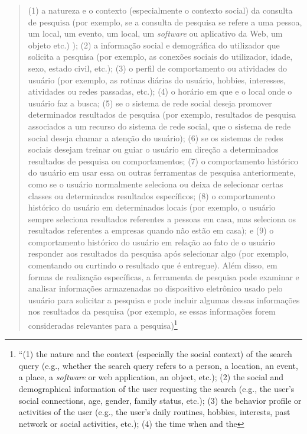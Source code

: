 \begin{quote}
(1) a natureza e o contexto (especialmente o contexto social) da
consulta de pesquisa (por exemplo, se a consulta de pesquisa se refere a
uma pessoa, um local, um evento, um local, um \emph{\emph{software}} ou aplicativo da
Web, um objeto etc.) ); (2) a informação social e demográfica do
utilizador que solicita a pesquisa (por exemplo, as conexões sociais do
utilizador, idade, sexo, estado civil, etc.); (3) o perfil de
comportamento ou atividades do usuário (por exemplo, as rotinas diárias
do usuário, hobbies, interesses, atividades ou redes passadas, etc.);
(4) o horário em que e o local onde o usuário faz a busca; (5) se o
sistema de rede social deseja promover determinados resultados de
pesquisa (por exemplo, resultados de pesquisa associados a um recurso do
sistema de rede social, que o sistema de rede social deseja chamar a
atenção do usuário); (6) se os sistemas de redes sociais desejam treinar
ou guiar o usuário em direção a determinados resultados de pesquisa ou
comportamentos; (7) o comportamento histórico do usuário em usar essa ou
outras ferramentas de pesquisa anteriormente, como se o usuário
normalmente seleciona ou deixa de selecionar certas classes ou
determinados resultados específicos; (8) o comportamento histórico do
usuário em determinados locais (por exemplo, o usuário sempre seleciona
resultados referentes a pessoas em casa, mas seleciona os resultados
referentes a empresas quando não estão em casa); e (9) o comportamento
histórico do usuário em relação ao fato de o usuário responder aos
resultados da pesquisa após selecionar algo (por exemplo, comentando ou
curtindo o resultado que é entregue). Além disso, em formas de
realização específicas, a ferramenta de pesquisa pode examinar e
analisar informações armazenadas no dispositivo eletrônico usado pelo
usuário para solicitar a pesquisa e pode incluir algumas dessas
informações nos resultados da pesquisa (por exemplo, se essas
informações forem consideradas relevantes para a pesquisa)\footnote{``(1)
  the nature and the context (especially the social context) of the
  search query (e.g., whether the search query refers to a person, a
  location, an event, a place, a \emph{\emph{software}} or web application, an object,
  etc.); (2) the social and demographical information of the user
  requesting the search (e.g., the user's social connections, age,
  gender, family status, etc.); (3) the behavior profile or activities
  of the user (e.g., the user's daily routines, hobbies, interests, past
  network or social activities, etc.); (4) the time when and the
}
\end{quote}
